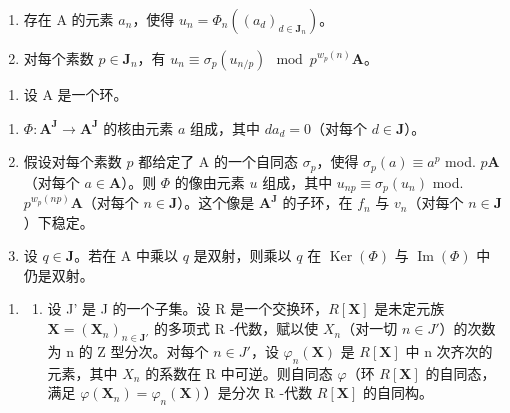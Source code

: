 \begin{enumerate}
\def\labelenumi{\alph{enumi})}
\item
  存在 A 的元素 \(a_n\)，使得 \(u_n = \Phi_n((a_d)_{d \in \mathbf{J}_n})\)。
\item
  对每个素数 \(p \in \mathbf{J}_n\)，有 \(u_n \equiv \sigma_p(u_{n/p}) \mod p^{w_p(n)}\mathbf{A}\)。
\end{enumerate}

\begin{enumerate}
\def\labelenumi{\arabic{enumi})}
\setcounter{enumi}{31}
\tightlist
\item
  设 A 是一个环。
\end{enumerate}

\begin{enumerate}
\def\labelenumi{\alph{enumi})}
\item
  \(\Phi: \mathbf{A}^{\mathbf{J}} \to \mathbf{A}^{\mathbf{J}}\) 的核由元素 \(a\) 组成，其中 \(da_d = 0\)（对每个 \(d \in \mathbf{J}\)）。
\item
  假设对每个素数 \(p\) 都给定了 A 的一个自同态 \(\sigma_p\)，使得 \(\sigma_p(a) \equiv a^p\) mod. \(p\mathbf{A}\)（对每个 \(a \in \mathbf{A}\)）。则 \(\Phi\) 的像由元素 \(u\) 组成，其中 \(u_{np} \equiv \sigma_p(u_n)\) mod. \(p^{w_p(np)}\mathbf{A}\)（对每个 \(n \in \mathbf{J}\)）。这个像是 \(\mathbf{A}^{\mathbf{J}}\) 的子环，在 \(f_n\) 与 \(v_n\)（对每个 \(n \in \mathbf{J}\)）下稳定。
\item
  设 \(q \in \mathbf{J}\)。若在 A 中乘以 \(q\) 是双射，则乘以 \(q\) 在 \(\operatorname{Ker}(\Phi)\) 与 \(\operatorname{Im}(\Phi)\) 中仍是双射。
\end{enumerate}

\begin{enumerate}
\def\labelenumi{\arabic{enumi})}
\setcounter{enumi}{32}
\tightlist
\item
  \begin{enumerate}
  \def\labelenumii{\alph{enumii})}
  \tightlist
  \item
    设 J' 是 J 的一个子集。设 R 是一个交换环，\(R[\mathbf{X}]\) 是未定元族 \(\mathbf{X} = (\mathbf{X}_{n})_{n \in \mathbf{J'}}\) 的多项式 R -代数，赋以使 \(X_{n}\)（对一切 \(n \in J'\)）的次数为 n 的 Z 型分次。对每个 \(n \in J'\)，设 \(\varphi_{n}(\mathbf{X})\) 是 \(R[\mathbf{X}]\) 中 n 次齐次的元素，其中 \(X_{n}\) 的系数在 R 中可逆。则自同态 \(\varphi\)（环 \(R[\mathbf{X}]\) 的自同态，满足 \(\varphi(\mathbf{X}_{n}) = \varphi_{n}(\mathbf{X})\)）是分次 R -代数 \(R[\mathbf{X}]\) 的自同构。
  \end{enumerate}
\end{enumerate}

